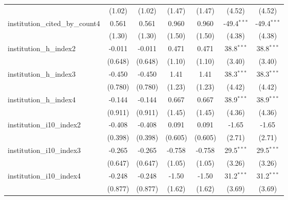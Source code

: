 \begin{tabular}{lcccccc}
                                         & (1.02)        & (1.02)        & (1.47)        & (1.47)        & (4.52)        & (4.52)\\   
   institution\_cited\_by\_count4        & 0.561         & 0.561         & 0.960         & 0.960         & -49.4$^{***}$ & -49.4$^{***}$\\   
                                         & (1.30)        & (1.30)        & (1.50)        & (1.50)        & (4.38)        & (4.38)\\   
   institution\_h\_index2                & -0.011        & -0.011        & 0.471         & 0.471         & 38.8$^{***}$  & 38.8$^{***}$\\   
                                         & (0.648)       & (0.648)       & (1.10)        & (1.10)        & (3.40)        & (3.40)\\   
   institution\_h\_index3                & -0.450        & -0.450        & 1.41          & 1.41          & 38.3$^{***}$  & 38.3$^{***}$\\   
                                         & (0.780)       & (0.780)       & (1.23)        & (1.23)        & (4.42)        & (4.42)\\   
   institution\_h\_index4                & -0.144        & -0.144        & 0.667         & 0.667         & 38.9$^{***}$  & 38.9$^{***}$\\   
                                         & (0.911)       & (0.911)       & (1.45)        & (1.45)        & (4.36)        & (4.36)\\   
   institution\_i10\_index2              & -0.408        & -0.408        & 0.091         & 0.091         & -1.65         & -1.65\\   
                                         & (0.398)       & (0.398)       & (0.605)       & (0.605)       & (2.71)        & (2.71)\\   
   institution\_i10\_index3              & -0.265        & -0.265        & -0.758        & -0.758        & 29.5$^{***}$  & 29.5$^{***}$\\   
                                         & (0.647)       & (0.647)       & (1.05)        & (1.05)        & (3.26)        & (3.26)\\   
   institution\_i10\_index4              & -0.248        & -0.248        & -1.50         & -1.50         & 31.2$^{***}$  & 31.2$^{***}$\\   
                                         & (0.877)       & (0.877)       & (1.62)        & (1.62)        & (3.69)        & (3.69)\\   

\end{tabular}
